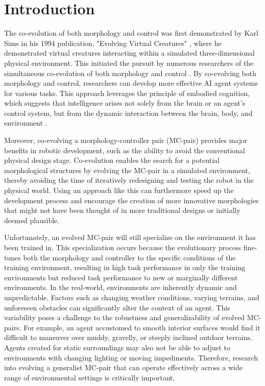 \section{Introduction}
The co-evolution of both morphology and control was first demonstrated by Karl Sims in his 1994 publication, "Evolving Virtual Creatures" \cite{Karl_Sims_1994}, where he demonstrated virtual creatures interacting within a simulated three-dimensional physical environment. This initiated the pursuit by numerous researchers of the simultaneous co-evolution of both morphology and control \cite{Cheney_2017,Emma_Stensby_2021,Joshua_Auerbach_2014,Luis_2024}. By co-evolving both morphology and control, researchers can develop more effective AI agent systems for various tasks. This approach leverages the principle of embodied cognition, which suggests that intelligence arises not solely from the brain or an agent's control system, but from the dynamic interaction between the brain, body, and environment \cite{Josh_Bongard_2013}.

Moreover, co-evolving a morphology-controller pair (MC-pair) provides major benefits in robotic development, such as the ability to avoid the conventional physical design stage. Co-evolution enables the search for a potential morphological structures by evolving the MC-pair in a simulated environment, thereby avoiding the time of iteratively redesigning and testing the robot in the physical world. Using an approach like this can furthermore speed up the development process and encourage the creation of more innovative morphologies that might not have been thought of in more traditional designs or initially deemed plausible.

Unfortunately, an evolved MC-pair will still specialize on the environment it has been trained in. This specialization occurs because the evolutionary process fine-tunes both the morphology and controller to the specific conditions of the training environment, resulting in high task performance in only the training environments but reduced task performance to new or marginally different environments. In the real-world, environments are inherently dynamic and unpredictable. Factors such as changing weather conditions, varying terrains, and unforeseen obstacles can significantly alter the context of an agent. This variability poses a challenge to the robustness and generalizability of evolved MC-pairs. For example, an agent accustomed to smooth interior surfaces would find it difficult to maneuver over muddy, gravelly, or steeply inclined outdoor terrains. Agents created for static surroundings may also not be able to adjust to environments with changing lighting or moving impediments. Therefore, research into evolving a generalist MC-pair that can operate effectively across a wide range of environmental settings is critically important.

